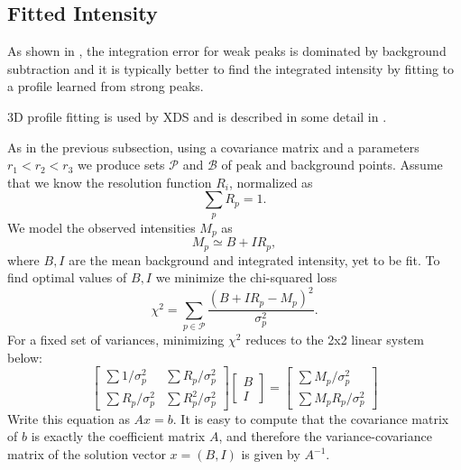\documentclass[11pt,a4paper]{article}
\def\calP{\mathcal{P}}
\def\calB{\mathcal{B}}
\begin{document}
\subsection{Fitted Intensity}

As shown in \cite{Dia69}, the integration error for weak peaks is dominated by background subtraction
and it is typically better to find the integrated intensity by fitting to a profile learned from strong peaks.

3D profile fitting is used by XDS \cite{Kab10a} and is described in some detail in \cite{Kab88,Kab10b}.

As in the previous subsection, using a covariance matrix and a parameters $r_1 < r_2 < r_3$ we produce sets $\calP$ and $\calB$ of peak and background points.
Assume that we know the resolution function $R_i$,
normalized as
\begin{equation}\label{Eresnor}
  \sum_p R_p = 1.
\end{equation}
We model the observed intensities $M_p$ as
\begin{equation} M_p \simeq B + I R_p, \end{equation}
where $B, I$ are the mean background and integrated intensity, yet to be fit. To find optimal values of $B,I$ we minimize the chi-squared loss
\begin{equation} \chi^2 = \sum_{p \in \calP} \frac{(B+IR_p - M_p)^2}{\sigma^2_p}. \end{equation}
For a fixed set of variances, minimizing $\chi^2$ reduces to the 2x2 linear system below:
\begin{equation}
  \begin{bmatrix}
    \sum 1/\sigma^2_p & \sum R_p / \sigma^2_p \\
    \sum R_p/\sigma_p^2 & \sum R_p^2 / \sigma^2_p
  \end{bmatrix}
  \begin{bmatrix}
    B \\
    I
  \end{bmatrix}
  =
  \begin{bmatrix}
    \sum M_p/\sigma^2_p \\
    \sum M_p R_p / \sigma^2_p
  \end{bmatrix}
\end{equation}
Write this equation as $Ax = b$. It is easy to compute that the covariance matrix of $b$ is exactly the coefficient matrix
 $A$, and therefore the variance-covariance matrix of the solution vector $x = (B, I)$ is given by $A^{-1}$.
\end{document}

